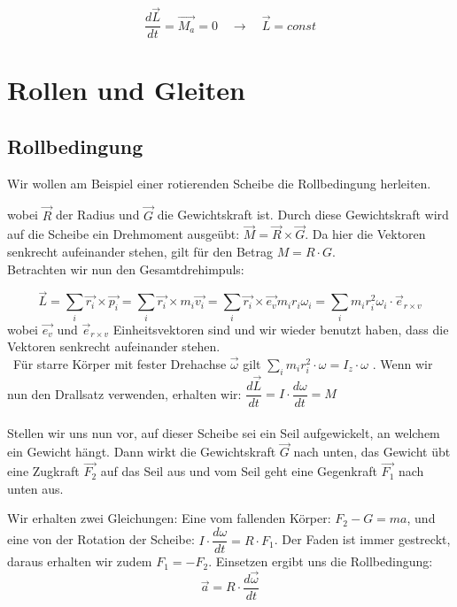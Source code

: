 \documentclass[12pt]{article}
\begin{document}
\begin{equation}
\dfrac{d \vec{L}}{dt} = \vec{M_a} = 0 \quad \rightarrow \quad \vec{L} = const
\end{equation}

\newpage
\section{Rollen und Gleiten}

\subsection{Rollbedingung}
Wir wollen am Beispiel einer rotierenden Scheibe die Rollbedingung herleiten.

\begin{figure}[H]
  \label{fig:1teil}
\end{figure} 
 wobei $\vec{R}$ der Radius und $\vec{G}$ die Gewichtskraft ist. Durch diese Gewichtskraft wird auf die Scheibe ein Drehmoment ausgeübt: $\vec{M} = \vec{R} \times \vec{G}$. Da hier die Vektoren senkrecht aufeinander stehen, gilt für den Betrag $M = R \cdot G$.\\
 Betrachten wir nun den Gesamtdrehimpuls: 
 
 \begin{equation*}
   \vec{L} = \sum_{i} \vec{r_i} \times \vec{p_i} = \sum_{i} \vec{r_i} \times m_i \vec{v_i} = \sum_{i} \vec{r_i} \times \vec{e_v} m_i r_i \omega_i = \sum_{i} m_i r_i^2 \omega_i \cdot \vec{e}_{r \times v} 
 \end{equation*}
wobei $\vec{e_v}$ und $\vec{e}_{r \times v}$ Einheitsvektoren sind und wir wieder benutzt haben, dass die Vektoren senkrecht aufeinander stehen. \\\ Für starre Körper mit fester Drehachse $\vec{\omega}$ gilt $\sum_{i} m_i r_i^2 \cdot \omega = I_z \cdot \omega$ .
 Wenn wir nun den Drallsatz verwenden, erhalten wir: $\dfrac{d \vec{L}}{dt} = I \cdot \dfrac{d \omega}{dt} = M$
\\
\\
Stellen wir uns nun vor, auf dieser Scheibe sei ein Seil aufgewickelt, an welchem ein Gewicht hängt. Dann wirkt die Gewichtskraft $\vec{G}$ nach unten, das Gewicht übt eine Zugkraft $\vec{F_2}$ auf das Seil aus und vom Seil geht eine Gegenkraft $\vec{F_1}$ nach unten aus.

\begin{figure}[H]
  \label{fig:1teil}
\end{figure} 
Wir erhalten zwei Gleichungen: Eine vom fallenden Körper: $ F_2 - G = ma$, und eine von der Rotation der Scheibe: $ I \cdot \dfrac{d\omega}{dt} = R \cdot F_1$. Der Faden ist immer gestreckt, daraus erhalten wir zudem $F_1 = -F_2$. Einsetzen ergibt uns die Rollbedingung:
\begin{equation}
\vec{a} = R \cdot \dfrac{d\vec{\omega}}{dt}
\end{equation}
\end{document}

